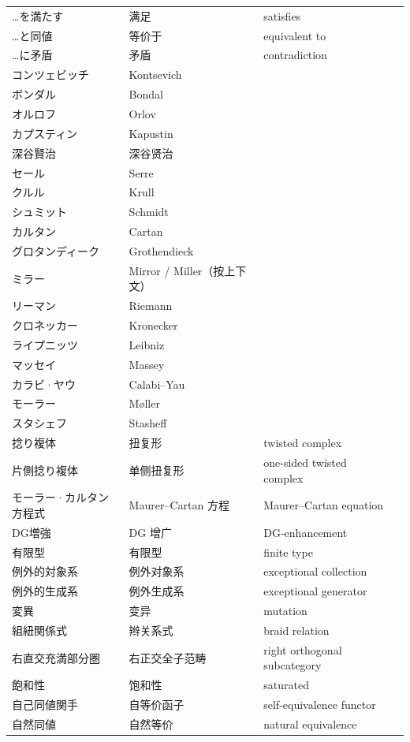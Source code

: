\begin{longtable}{p{}p{}p{}p{}}
…を満たす & 满足 & satisfies &  \\
…と同値 & 等价于 & equivalent to &  \\
…に矛盾 & 矛盾 & contradiction &  \\
コンツェビッチ & Kontsevich &  &  \\
ボンダル & Bondal &  &  \\
オルロフ & Orlov &  &  \\
カプスティン & Kapustin &  &  \\
深谷賢治 & 深谷贤治 &  &  \\
セール & Serre &  &  \\
クルル & Krull &  &  \\
シュミット & Schmidt &  &  \\
カルタン & Cartan &  &  \\
グロタンディーク & Grothendieck &  &  \\
ミラー & Mirror / Miller（按上下文） &  &  \\
リーマン & Riemann &  &  \\
クロネッカー & Kronecker &  &  \\
ライプニッツ & Leibniz &  &  \\
マッセイ & Massey &  &  \\
カラビ·ヤウ & Calabi–Yau &  &  \\
モーラー & Møller &  &  \\
スタシェフ & Stasheff &  &  \\
捻り複体 & 扭复形 & twisted complex &  \\
片側捻り複体 & 单侧扭复形 & one-sided twisted complex &  \\
モーラー·カルタン方程式 & Maurer–Cartan 方程 & Maurer–Cartan equation &  \\
DG増強 & DG 增广 & DG-enhancement &  \\
有限型 & 有限型 & finite type &  \\
例外的対象系 & 例外对象系 & exceptional collection &  \\
例外的生成系 & 例外生成系 & exceptional generator &  \\
変異 & 变异 & mutation &  \\
組紐関係式 & 辫关系式 & braid relation &  \\
右直交充満部分圏 & 右正交全子范畴 & right orthogonal subcategory &  \\
飽和性 & 饱和性 & saturated &  \\
自己同値関手 & 自等价函子 & self-equivalence functor &  \\
自然同値 & 自然等价 & natural equivalence &  \\

\end{longtable}
